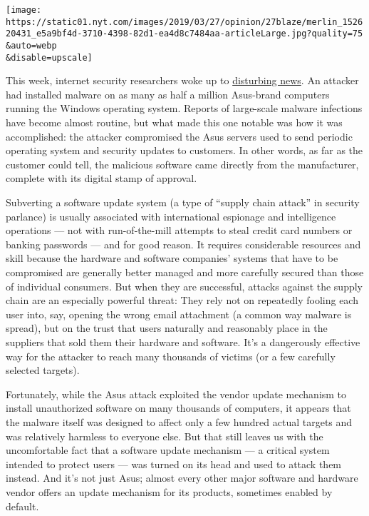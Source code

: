 \texttt{[image: https://static01.nyt.com/images/2019/03/27/opinion/27blaze/merlin\_152620431\_e5a9bf4d-3710-4398-82d1-ea4d8c7484aa-articleLarge.jpg?quality=75\\\&auto=webp\\\&disable=upscale]}

This week, internet security researchers woke up to
\href{https://motherboard.vice.com/en_us/article/pan9wn/hackers-hijacked-asus-software-updates-to-install-backdoors-on-thousands-of-computers}{disturbing
news}. An attacker had installed malware on as many as half a million
Asus-brand computers running the Windows operating system. Reports of
large-scale malware infections have become almost routine, but what made
this one notable was how it was accomplished: the attacker compromised
the Asus servers used to send periodic operating system and security
updates to customers. In other words, as far as the customer could tell,
the malicious software came directly from the manufacturer, complete
with its digital stamp of approval.

Subverting a software update system (a type of ``supply chain attack''
in security parlance) is usually associated with international espionage
and intelligence operations --- not with run-of-the-mill attempts to
steal credit card numbers or banking passwords --- and for good reason.
It requires considerable resources and skill because the hardware and
software companies' systems that have to be compromised are generally
better managed and more carefully secured than those of individual
consumers. But when they are successful, attacks against the supply
chain are an especially powerful threat: They rely not on repeatedly
fooling each user into, say, opening the wrong email attachment (a
common way malware is spread), but on the trust that users naturally and
reasonably place in the suppliers that sold them their hardware and
software. It's a dangerously effective way for the attacker to reach
many thousands of victims (or a few carefully selected targets).

Fortunately, while the Asus attack exploited the vendor update mechanism
to install unauthorized software on many thousands of computers, it
appears that the malware itself was designed to affect only a few
hundred actual targets and was relatively harmless to everyone else. But
that still leaves us with the uncomfortable fact that a software update
mechanism --- a critical system intended to protect users --- was turned
on its head and used to attack them instead. And it's not just Asus;
almost every other major software and hardware vendor offers an update
mechanism for its products, sometimes enabled by default.

